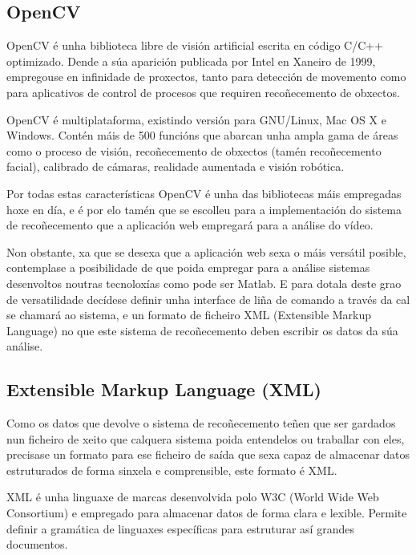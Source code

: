 \subsection{OpenCV}
    
    OpenCV é unha biblioteca libre de visión artificial escrita en código C/C++ optimizado.
    Dende a súa aparición publicada por Intel en Xaneiro de 1999, empregouse en infinidade 
    de proxectos, tanto para detección de movemento como para aplicativos de control de procesos
    que requiren recoñecemento de obxectos.
    
    OpenCV é multiplataforma, existindo versión para GNU/Linux, Mac OS X e Windows. Contén máis 
    de 500 funcións que abarcan unha ampla gama de áreas como o proceso de visión, recoñecemento
    de obxectos (tamén recoñecemento facial), calibrado de cámaras, realidade aumentada e visión
    robótica.
    
    Por todas estas características OpenCV é unha das bibliotecas máis empregadas hoxe en día, e é
    por elo tamén que se escolleu para a implementación do sistema de recoñecemento que a aplicación
    web empregará para a análise do vídeo.
    
    Non obstante, xa que se desexa que a aplicación web sexa o máis versátil posible, contemplase a
    posibilidade de que poida empregar para a análise sistemas desenvoltos noutras tecnoloxías como
    pode ser Matlab. E para dotala deste grao de versatilidade decídese definir unha interface de
    liña de comando a través da cal se chamará ao sistema, e un formato de ficheiro XML (Extensible 
    Markup Language) no que este sistema de recoñecemento deben escribir os datos da súa análise.
        
\subsection{Extensible Markup Language (XML)}
    
    Como os datos que devolve o sistema de recoñecemento teñen que ser gardados nun ficheiro de 
    xeito que calquera sistema poida entendelos ou traballar con eles, precisase un formato para
    ese ficheiro de saída que sexa capaz de almacenar datos estruturados de forma sinxela e 
    comprensible, este formato é XML.

    XML é unha linguaxe de marcas desenvolvida polo W3C (World Wide Web Consortium) e empregado
    para almacenar datos de forma clara e lexible. Permite definir a gramática de linguaxes 
    específicas para estruturar así grandes documentos.
    
